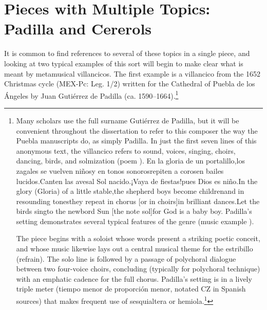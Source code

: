 \documentclass{memoir}
\begin{document}
{{{    \section{Pieces with Multiple Topics: Padilla and Cererols}
    \label{}
    
      It is common to find references to several of these topics in a single piece, and looking at two typical examples of this sort will begin to make clear what is meant by metamusical villancicos.
      The first example is a villancico from the 1652 Christmas cycle (MEX-Pc: Leg. 1/2) written for the Cathedral of Puebla de los Ángeles by Juan Gutiérrez de Padilla (ca. 1590–1664).\footnote{%
	Many scholars use the full surname Gutiérrez de Padilla, but it will be convenient throughout the dissertation to refer to this composer the way the Puebla manuscripts do, as simply Padilla.
      In just the first seven lines of this anonymous text, the villancico refers to sound, voices, singing, choirs, dancing, birds, and solmization (poem ).
    En la gloria de un portalillo,los zagales se vuelven niñosy en tonos sonorosrepiten a corosen bailes lucidos.Canten las avesal Sol nacido.¡Vaya de fiestas!pues Dios es niño.In the glory (Gloria) of a little stable,the shepherd boys become childrenand in resounding tonesthey repeat in chorus [or in choirs]in brilliant dances.Let the birds singto the newbord Sun [the note sol]for God is a baby boy.
      Padilla’s setting demonstrates several typical features of the genre (music example ).
      
      The piece begins with a soloist whose words present a striking poetic conceit, and whose music likewise lays out a central musical theme for the estribillo (refrain).
      The solo line is followed by a passage of polychoral dialogue between two four-voice choirs, concluding (typically for polychoral technique) with an emphatic cadence for the full chorus.
      Padilla’s setting is in a lively triple meter (tiempo menor de proporción menor, notated CZ in Spanish sources) that makes frequent use of sesquialtera or hemiola.\footnote{%
	The preface provides additional background about the terminology and common structures of seventeenth-century villancicos.
	Please note the discussion there on common voicing and instrumentation patterns, and on rhythmic theory.
      The shifts of duple and triple stresses combine with stresses on the second beat of the compás (tactus, measure) to create an energetic atmosphere with a rejoicing affect.
      The polychoral dialogue, with the voices of each choir declaiming homorhythmically in the same highly rhythmic, syncopated manner as the soloist, and with the tiples (boy sopranos) of both choirs singing at the top of their range, would have brilliantly seized the attention of listeners.
    
}}}}}
\end{document}
